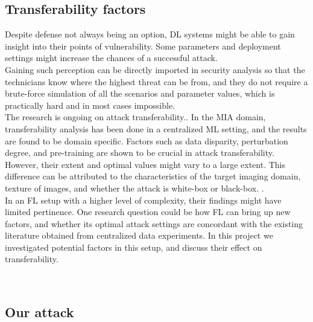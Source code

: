 \subsection{Transferability factors}
Despite defense not always being an option, DL systems might be able to gain insight into their points of vulnerability. Some parameters and deployment settings might increase the chances of a successful attack.\\
Gaining such perception can be directly imported in security analysis so that the technicians know where the highest threat can be from, and they do not require a brute-force simulation of all the scenarios and parameter values, which is practically hard and in most cases impossible. 
\\The research is ongoing on attack transferability.\cite{gao2022boosting,elaalami2022bod,dai2021fast,duan2022novel,du2020hybrid,zheng2020efficient,shafahi2019adversarial,qiu2022framework}. In the MIA domain, transferability analysis has been done in a centralized ML setting, and the results are found to be domain specific. Factors such as data disparity, perturbation degree, and pre-training are shown to be crucial in attack transferability. However, their extent and optimal values might vary to a large extent. This difference can be attributed to the characteristics of the target imaging domain, texture of images, and whether the attack is white-box or black-box.\cite{ma2021understanding} \cite{bortsova2021adversarial}. \\ In an FL setup with a higher level of complexity, their findings might have limited pertinence. \cite{costa2021covert} One research question could be how FL can bring up new factors, and whether its optimal attack settings are concordant with the existing literature obtained from centralized data experiments. 
In this project we investigated potential factors in this setup, and discuss their effect on transferability.




\\\subsection{Our attack}

